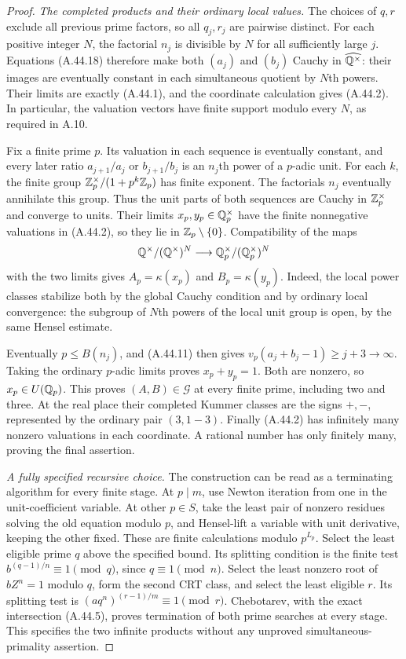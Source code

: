\begin{proof}
\emph{The completed products and their ordinary local values.}
The choices of $q,r$ exclude all previous prime factors,
so all $q_j,r_j$ are pairwise distinct. For each positive
integer $N$, the factorial $n_j$ is divisible by $N$
for all sufficiently large $j$. Equations (A.44.18)
therefore make both $(a_j)$ and $(b_j)$ Cauchy in
$\widehat{\mathbb Q^\times}$: their images are eventually
constant in each simultaneous quotient by $N$th
powers. Their limits are exactly (A.44.1), and the
coordinate calculation gives (A.44.2). In particular,
the valuation vectors have finite support modulo every
$N$, as required in A.10.

Fix a finite prime $p$. Its valuation in each sequence
is eventually constant, and every later ratio
$a_{j+1}/a_j$ or $b_{j+1}/b_j$ is an $n_j$th power
of a $p$-adic unit. For each $k$, the finite group
$\mathbb Z_p^\times/(1+p^k\mathbb Z_p)$ has finite exponent.
The factorials $n_j$ eventually annihilate this
group. Thus the unit parts of both sequences are
Cauchy in $\mathbb Z_p^\times$ and converge to units.
Their limits $x_p,y_p\in\mathbb Q_p^\times$ have the finite
nonnegative valuations in (A.44.2), so they lie in
$\mathbb Z_p\setminus\{0\}$. Compatibility of the maps
\[
 \mathbb Q^\times/(\mathbb Q^\times)^N
       \longrightarrow
 \mathbb Q_p^\times/(\mathbb Q_p^\times)^N
\]
with the two limits gives
$A_p=\kappa(x_p)$ and $B_p=\kappa(y_p)$.
Indeed, the local power classes stabilize both by
the global Cauchy condition and by ordinary local
convergence: the subgroup of $N$th powers of the
local unit group is open, by the same Hensel estimate.

Eventually $p\le B(n_j)$, and (A.44.11) then gives
$v_p(a_j+b_j-1)\ge j+3\longrightarrow\infty$.
Taking the ordinary $p$-adic limits proves
$x_p+y_p=1$. Both are nonzero, so $x_p\in U(\mathbb Q_p)$.
This proves $(A,B)\in\mathcal G$ at every finite
prime, including two and three. At the real place
their completed Kummer classes are the signs $+,-$,
represented by the ordinary pair $(3,1-3)$.
Finally (A.44.2)
has infinitely many nonzero valuations in each
coordinate. A rational number has only finitely
many, proving the final assertion.

\emph{A fully specified recursive choice.}
The construction can be read as a terminating algorithm
for every finite stage. At $p\mid m$, use Newton
iteration from one in the unit-coefficient variable.
At other $p\in S$, take the least pair of nonzero
residues solving the old equation modulo $p$, and
Hensel-lift a variable with unit derivative, keeping
the other fixed. These are finite calculations modulo
$p^{L_p}$. Select the least eligible prime $q$ above
the specified bound. Its splitting condition is the
finite test
$b^{(q-1)/n}\equiv1\pmod q$, since
$q\equiv1\pmod n$. Select the least nonzero root
of $bZ^n=1$ modulo $q$, form the second CRT class,
and select the least eligible $r$. Its splitting
test is
$(a q^n)^{(r-1)/m}\equiv1\pmod r$.
Chebotarev, with the exact intersection (A.44.5),
proves termination of both prime searches at every
stage. This specifies the two infinite products
without any unproved simultaneous-primality assertion.
\end{proof}

